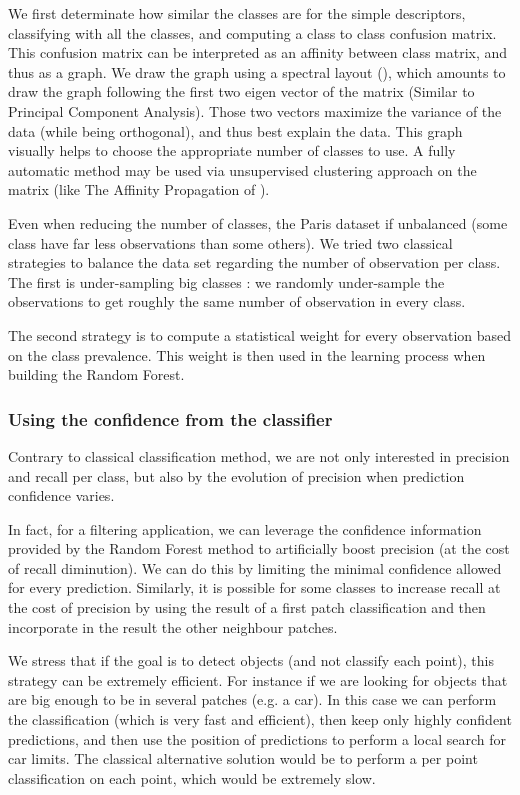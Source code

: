 		\label{method.classification.spectral_layout}
		We first determinate how similar the classes are for the simple descriptors, classifying with all the classes, and computing a class to class confusion matrix.
		This confusion matrix can be interpreted as an affinity between class matrix, and thus as a graph.
		We draw the graph using a spectral layout (\cite{Networkx2014}),
		 which amounts to draw the graph following the first two eigen vector of the matrix (Similar to Principal Component Analysis).
		Those two vectors maximize the variance of the data (while being orthogonal), and thus best explain the data.
		This graph visually helps to choose the appropriate number of classes to use.
		A fully automatic method may be used via unsupervised clustering approach on the matrix 
		(like The Affinity Propagation of \cite{Frey2007}).
		
		Even when reducing the number of classes, the Paris dataset if unbalanced (some class have far less observations than some others).
		We tried two classical strategies to balance the data set regarding the number of observation per class.
		The first is under-sampling big classes : we randomly under-sample the observations to get roughly the same number of observation in every class.
		
		The second strategy is to compute a statistical weight for every observation based on the class prevalence. 
		This weight is then used in the learning process when building the Random Forest.
		
		\subsubsection{Using the confidence from the classifier} 
		\label{method.classification.using_confidence}
		Contrary to classical classification method, we are not only interested in precision and recall per class, but also by the evolution of precision when prediction confidence varies.
		
		In fact, for a filtering application, we can leverage the confidence information provided by the Random Forest method to artificially boost precision (at the cost of recall diminution). We can do this by limiting the minimal confidence allowed for every prediction.
		Similarly, it is possible for some classes to increase recall at the cost of precision by using the result of a first patch classification and then incorporate in the result the other neighbour patches. 
		
		We stress that if the goal is to detect objects (and not classify each point), this strategy can be extremely efficient.
		For instance if we are looking for objects that are big enough to be in several patches (e.g. a car).
		In this case we can perform the classification (which is very fast and efficient), then keep only highly confident predictions, and then use the position of predictions to perform a local search for car limits.
		The classical alternative solution would be to perform a per point classification on each point, which would be extremely slow.
		 